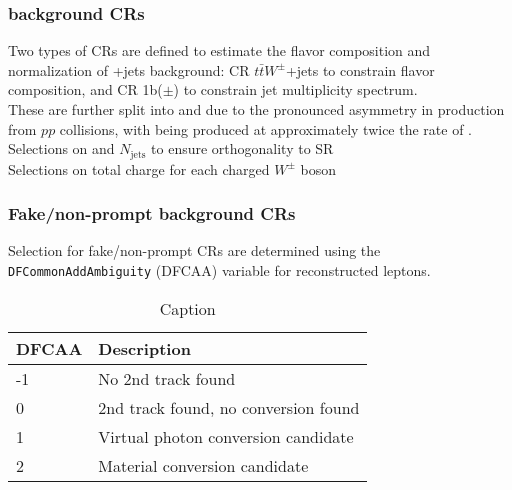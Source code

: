 \documentclass[../thesis.tex]{subfiles}
\begin{document}
\subsubsection*{\ttW background CRs}
Two types of CRs are defined to estimate the flavor composition and normalization of \ttW +jets background: CR $t\bar{t}W^\pm$+jets to constrain flavor composition, and CR 1b($\pm$) to constrain jet multiplicity spectrum.\\
These are further split into \CRttWpm and \CRonebpm due to the pronounced asymmetry in \ttW production from $pp$ collisions, with \ttWplus being produced at approximately twice the rate of \ttWminus.
Selections on \HT and $N_\mathrm{jets}$ to ensure orthogonality to SR\\
Selections on total charge for each charged $W^\pm$ boson\\

\subsubsection*{Fake/non-prompt background CRs}
Selection for fake/non-prompt CRs are determined using the \verb|DFCommonAddAmbiguity| (DFCAA) variable for reconstructed leptons.

\begin{table}[!ht]
\centering
\begin{tabular}{p{2cm}|l}
\toprule\toprule
DFCAA & Description \\
\midrule
-1			& No 2nd track found \\
0			& 2nd track found, no conversion found \\
1			& Virtual photon conversion candidate \\
2			& Material conversion candidate\\
\bottomrule\bottomrule
\end{tabular}
\caption{\label{tab:ana:DFCAA}Caption}%
\end{table}
\end{document}
